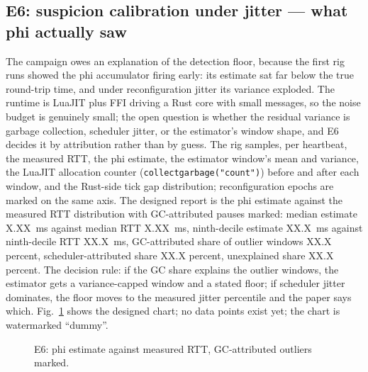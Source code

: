 \documentclass[10pt,journal,letterpaper]{IEEEtran}
\newcommand{\code}[1]{\texttt{#1}}
\begin{document}
\subsection{E6: suspicion calibration under jitter --- what phi actually saw}
The campaign owes an explanation of the detection floor, because the first
rig runs showed the phi accumulator firing early: its estimate sat far
below the true round-trip time, and under reconfiguration jitter its
variance exploded. The runtime is LuaJIT plus FFI driving a Rust core with
small messages, so the noise budget is genuinely small; the open question
is whether the residual variance is garbage collection, scheduler jitter,
or the estimator's window shape, and E6 decides it by attribution rather
than by guess. The rig samples, per heartbeat, the measured RTT, the phi
estimate, the estimator window's mean and variance, the LuaJIT allocation
counter (\code{collectgarbage("count")}) before and after each window, and
the Rust-side tick gap distribution; reconfiguration epochs are marked on
the same axis. The designed report is the phi estimate against the measured
RTT distribution with GC-attributed pauses marked: median estimate X.XX~ms
against median RTT X.XX~ms, ninth-decile estimate XX.X~ms against
ninth-decile RTT XX.X~ms, GC-attributed share of outlier windows XX.X
percent, scheduler-attributed share XX.X percent, unexplained share
XX.X percent. The decision rule: if the GC share explains the outlier
windows, the estimator gets a variance-capped window and a stated floor;
if scheduler jitter dominates, the floor moves to the measured jitter
percentile and the paper says which. Fig.~\ref{fig:e6} shows the designed
chart; no data points exist yet; the chart is watermarked ``dummy''.

\begin{figure}[t]
\centering
{}
\caption{E6: phi estimate against measured RTT, GC-attributed outliers marked.}
\label{fig:e6}
\end{figure}
\end{document}
